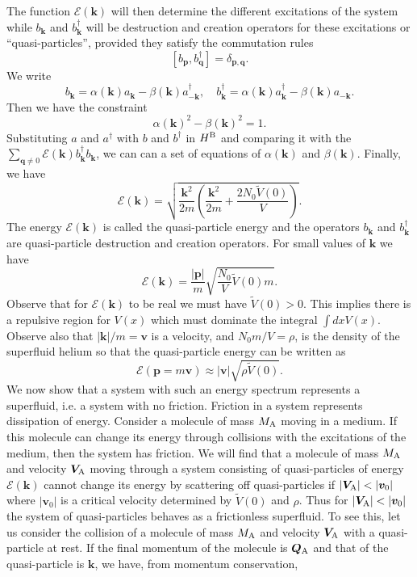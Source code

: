 The function $\mathcal{E}(\bm{k})$  will then determine the different excitations of the system while $b_{\bm{k}}$ and $b^{\dagger}_{\bm{k}}$ will be destruction and creation operators for these excitations or ``quasi-particles'', provided they satisfy the commutation rules
\[[b_{\bm{p}},b_{\bm{q}}^{\dagger}] = \delta_{\bm{p},\bm{q}}.\]
We write
\[b_{\bm{k}} = \alpha(\bm{k})a_{\bm{k}} - \beta(\bm{k})a^{\dagger}_{-\bm{k}} , \quad b^{\dagger}_{\bm{k}} = \alpha(\bm{k})a^{\dagger}_{\bm{k}} - \beta(\bm{k})a_{-\bm{k}} .\]
Then we have the constraint
\[\alpha(\bm{k})^2 - \beta(\bm{k})^2 = 1.\]
Substituting $a$ and $a^{\dagger}$ with $b$ and $b^{\dagger}$ in $H^{\rm B}$ and comparing it with the $\sum_{\bm{q} \neq 0} \mathcal{E}(\bm{k})b^{\dagger}_{\bm{k}} b_{\bm{k}}$, we can can a set of equations of $\alpha(\bm{k})$ and $\beta(\bm{k})$. Finally, we have
\[\mathcal{E}(\bm{k}) = \sqrt{\frac{\bm{k}^2}{2m} \left(\frac{\bm{k}^2}{2m} + \frac{2N_0\tilde{V}(0)}{V} \right) }.\]
The energy $\mathcal{E}(\bm{k})$ is called the quasi-particle energy and the operators $b_{\bm{k}}$ and $b^{\dagger}_{\bm{k}}$ are quasi-particle destruction and creation operators. 
For small values of $\bm{k}$ we have
\[\mathcal{E}(\bm{k}) = \frac{|\bm{p}|}{m} \sqrt{\frac{N_0}{V}\tilde{V}(0)m}.\]
Observe that for $\mathcal{E}(\bm{k})$ to be real we must have $\tilde{V}(0) > 0$. This implies there is a repulsive region for $V(x)$ which must dominate the integral $\int dx V(x)$. Observe also that $|\bm{k}|/m = \bm{v}$ is a velocity, and $N_0m/V = \rho$, is the density of the superfluid helium so that the quasi-particle energy can be written as 
\[\mathcal{E}(\bm{p} = m\bm{v}) \approx |\bm{v}|\sqrt{\rho\tilde{V}(0)}.\]
We now show that a system with such an energy spectrum represents a superfluid, i.e. a system with no friction.
Friction in a system represents dissipation of energy.
Consider a molecule of mass $M_{\rm A}$ moving in a medium. If this molecule can change its energy through collisions with the excitations of the medium, then the system has friction. 
We will find that a molecule of mass $M_{\rm A}$ and velocity $\bm{V}_{\rm A}$ moving through a system consisting of quasi-particles of energy $\mathcal{E}(\bm{k})$ cannot change its energy by scattering off quasi-particles if $|\bm{V}_{\rm A}| < |\bm{v}_0|$ where $|\bm{v}_0|$ is a critical velocity determined by $\tilde{V}(0)$ and $\rho$. 
Thus for $|\bm{V}_{\rm A}| < |\bm{v}_0|$ the system of quasi-particles behaves as a frictionless superfluid.
To see this, let us consider the collision of a molecule of mass $M_{\rm A}$ and velocity $\bm{V}_{\rm A}$ with a quasi-particle at rest. If the final momentum of the molecule is $\bm{Q}_{\rm A}$ and that of the quasi-particle is $\bm{k}$, we have, from momentum conservation,
